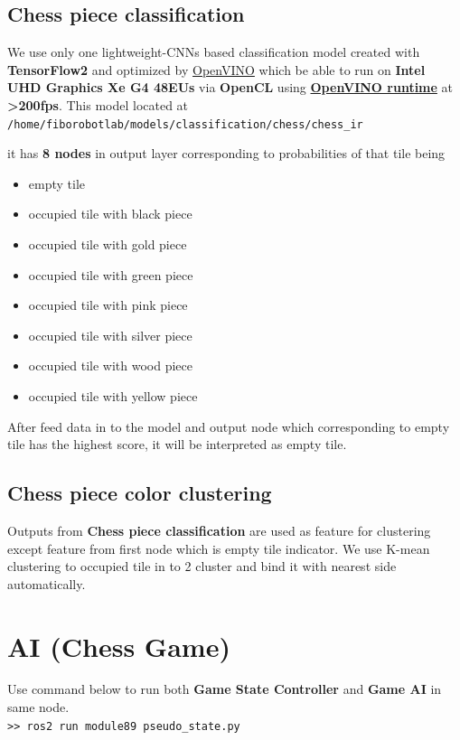 \documentclass[11pt,fleqn]{book} %
\begin{document}
\subsection{Chess piece classification}
\raggedright
We use only one lightweight-CNNs based classification model created with \textbf{TensorFlow2} and optimized by \href{https://docs.openvino.ai/latest/index.html}{OpenVINO} which be able to run on \textbf{\color{blue} Intel UHD Graphics Xe G4 48EUs} via \textbf{OpenCL} using \href{https://docs.openvino.ai/latest/openvino_docs_install_guides_install_runtime.html}{\textbf{OpenVINO runtime}} at \textbf{\color{blue}>200fps}. This model located at\\
\centering
\texttt{/home/fiborobotlab/models/classification/chess/chess\_ir}\\
\raggedright
it has \textbf{\color{red}8 nodes} in output layer corresponding to probabilities of that tile being
\begin{itemize}
    \item empty tile
    \item occupied tile with black piece
    \item occupied tile with gold piece
    \item occupied tile with green piece
    \item occupied tile with pink piece
    \item occupied tile with silver piece
    \item occupied tile with wood piece
    \item occupied tile with yellow piece
\end{itemize}
After feed data in to the model and output node which corresponding to empty tile has the highest score, it will be interpreted as empty tile.

\subsection{Chess piece color clustering}
Outputs from \textbf{Chess piece classification} are used as feature for clustering except feature from first node which is empty tile indicator. We use K-mean clustering to occupied tile in to 2 cluster and bind it with nearest side automatically.


\section{AI (Chess Game)}
\raggedright
Use command below to run both \textbf{Game State Controller} and \textbf{Game AI} in same node.\\
\texttt{>> ros2 run module89 pseudo\_state.py}\\
\raggedright
\end{document}
